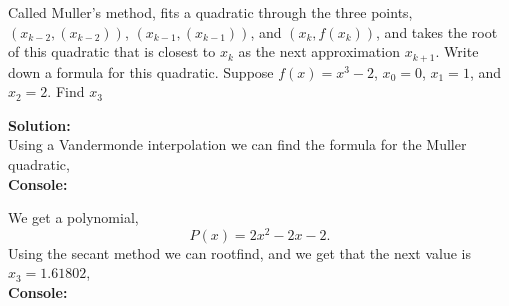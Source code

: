 \documentclass[12pt]{article}
\makeatletter
\theoremstyle{homework}
\newenvironment{exercise}[1]
{\def\@currentlabel{#1}\exercisecore}
{\endexercisecore}
\newcommand{\localhead}[1]{\par\smallskip\noindent\textbf{#1}\nobreak\\}%
\newcommand\solution{\localhead{Solution:}}
\makeatother
\begin{document}
\begin{exercise}{Exercise 8.2} Called Muller’s method, fits a quadratic through the three points, $(x_{k−2}, (x_{k−2}))$, $(x_{k−1}, (x_{k−1}))$, and  $(x_k, f(x_k))$,  and  takes the  root  of  this  quadratic that  is closest to $x_k$ as the next approximation $x_{k+1}$. Write down a formula for this quadratic. Suppose $f(x) = x^3 - 2$, $x_0 = 0$, $x_1 = 1$, and $x_2 = 2$. Find $x_3$
  \solution Using a Vandermonde interpolation we can find the formula for the Muller quadratic,\\
  \textbf{Console:}
\begin{center}

\end{center}
We get a polynomial, 
\begin{equation*}
  P(x) = 2x^2 - 2x - 2.
\end{equation*}
Using the secant method we can rootfind, and we get that the next value is $x_3 = 1.61802$,\\
\textbf{Console:}
\begin{center}

\end{center}


  




\end{exercise}
\end{document}
